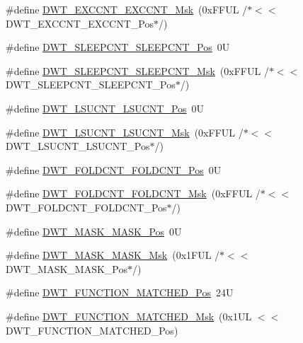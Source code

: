 \begin{DoxyCompactItemize}
\item 
\#define \hyperlink{group___c_m_s_i_s___d_w_t_ga057fa604a107b58a198bbbadb47e69c9}{D\-W\-T\-\_\-\-E\-X\-C\-C\-N\-T\-\_\-\-E\-X\-C\-C\-N\-T\-\_\-\-Msk}~(0x\-F\-F\-U\-L /$\ast$$<$$<$ D\-W\-T\-\_\-\-E\-X\-C\-C\-N\-T\-\_\-\-E\-X\-C\-C\-N\-T\-\_\-\-Pos$\ast$/)
\item 
\#define \hyperlink{group___c_m_s_i_s___d_w_t_ga0371a84a7996dc5852c56afb2676ba1c}{D\-W\-T\-\_\-\-S\-L\-E\-E\-P\-C\-N\-T\-\_\-\-S\-L\-E\-E\-P\-C\-N\-T\-\_\-\-Pos}~0\-U
\item 
\#define \hyperlink{group___c_m_s_i_s___d_w_t_ga1e340751d71413fef400a0a1d76cc828}{D\-W\-T\-\_\-\-S\-L\-E\-E\-P\-C\-N\-T\-\_\-\-S\-L\-E\-E\-P\-C\-N\-T\-\_\-\-Msk}~(0x\-F\-F\-U\-L /$\ast$$<$$<$ D\-W\-T\-\_\-\-S\-L\-E\-E\-P\-C\-N\-T\-\_\-\-S\-L\-E\-E\-P\-C\-N\-T\-\_\-\-Pos$\ast$/)
\item 
\#define \hyperlink{group___c_m_s_i_s___d_w_t_gab9394c7911b0b4312a096dad91d53a3d}{D\-W\-T\-\_\-\-L\-S\-U\-C\-N\-T\-\_\-\-L\-S\-U\-C\-N\-T\-\_\-\-Pos}~0\-U
\item 
\#define \hyperlink{group___c_m_s_i_s___d_w_t_ga2186d7fc9317e20bad61336ee2925615}{D\-W\-T\-\_\-\-L\-S\-U\-C\-N\-T\-\_\-\-L\-S\-U\-C\-N\-T\-\_\-\-Msk}~(0x\-F\-F\-U\-L /$\ast$$<$$<$ D\-W\-T\-\_\-\-L\-S\-U\-C\-N\-T\-\_\-\-L\-S\-U\-C\-N\-T\-\_\-\-Pos$\ast$/)
\item 
\#define \hyperlink{group___c_m_s_i_s___d_w_t_ga7f8af5ac12d178ba31a516f6ed141455}{D\-W\-T\-\_\-\-F\-O\-L\-D\-C\-N\-T\-\_\-\-F\-O\-L\-D\-C\-N\-T\-\_\-\-Pos}~0\-U
\item 
\#define \hyperlink{group___c_m_s_i_s___d_w_t_ga9cb73d0342d38b14e41027d3c5c02647}{D\-W\-T\-\_\-\-F\-O\-L\-D\-C\-N\-T\-\_\-\-F\-O\-L\-D\-C\-N\-T\-\_\-\-Msk}~(0x\-F\-F\-U\-L /$\ast$$<$$<$ D\-W\-T\-\_\-\-F\-O\-L\-D\-C\-N\-T\-\_\-\-F\-O\-L\-D\-C\-N\-T\-\_\-\-Pos$\ast$/)
\item 
\#define \hyperlink{group___c_m_s_i_s___d_w_t_gaf798ae34e2b9280ea64f4d9920cd2e7d}{D\-W\-T\-\_\-\-M\-A\-S\-K\-\_\-\-M\-A\-S\-K\-\_\-\-Pos}~0\-U
\item 
\#define \hyperlink{group___c_m_s_i_s___d_w_t_gadd798deb0f1312feab4fb05dcddc229b}{D\-W\-T\-\_\-\-M\-A\-S\-K\-\_\-\-M\-A\-S\-K\-\_\-\-Msk}~(0x1\-F\-U\-L /$\ast$$<$$<$ D\-W\-T\-\_\-\-M\-A\-S\-K\-\_\-\-M\-A\-S\-K\-\_\-\-Pos$\ast$/)
\item 
\#define \hyperlink{group___c_m_s_i_s___d_w_t_ga22c5787493f74a6bacf6ffb103a190ba}{D\-W\-T\-\_\-\-F\-U\-N\-C\-T\-I\-O\-N\-\_\-\-M\-A\-T\-C\-H\-E\-D\-\_\-\-Pos}~24\-U
\item 
\#define \hyperlink{group___c_m_s_i_s___d_w_t_gac8b1a655947490280709037808eec8ac}{D\-W\-T\-\_\-\-F\-U\-N\-C\-T\-I\-O\-N\-\_\-\-M\-A\-T\-C\-H\-E\-D\-\_\-\-Msk}~(0x1\-U\-L $<$$<$ D\-W\-T\-\_\-\-F\-U\-N\-C\-T\-I\-O\-N\-\_\-\-M\-A\-T\-C\-H\-E\-D\-\_\-\-Pos)
$$
\end{DoxyCompactItemize}
